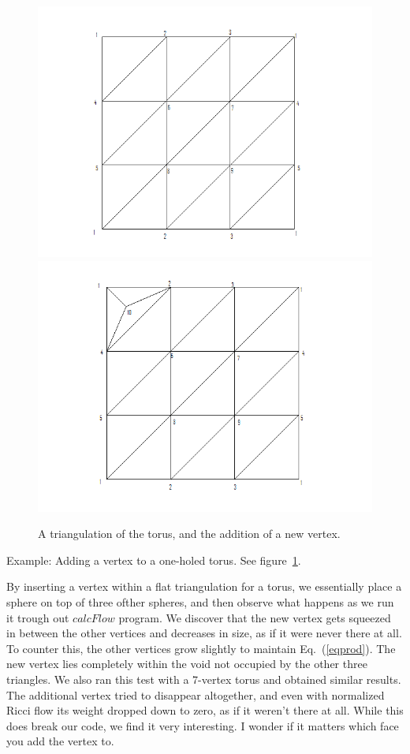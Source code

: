\documentclass[12pt]{article}
\begin{document}
\begin{figure}
\includegraphics[scale = 0.5]{torus2.png}
\includegraphics[scale = 0.5]{torus2addvertex.png}
\caption{A triangulation of the torus, and the addition of a new vertex.}
\label{torusaddv}
\end{figure}
  
\noindent Example: Adding a vertex to a one-holed torus. See figure~\ref{torusaddv}. \newline

\noindent By inserting a vertex within a flat triangulation for a torus, we essentially place a sphere on top of three ofther spheres, and then observe what happens as we run it trough out $calcFlow$ program. We discover that the new vertex gets squeezed in between the other vertices and decreases in size, as if it were never there at all. To counter this, the other vertices grow slightly to maintain Eq.~(\ref{eqprod}). The new vertex lies completely within the void not occupied by the other three triangles. We also ran this test with a 7-vertex torus and obtained similar results. The additional vertex tried to disappear altogether, and even with normalized Ricci flow its weight dropped down to zero, as if it weren't there at all. While this does break our code, we find it very interesting. I wonder if it matters which face you add the vertex to. \newline
\end{document}
